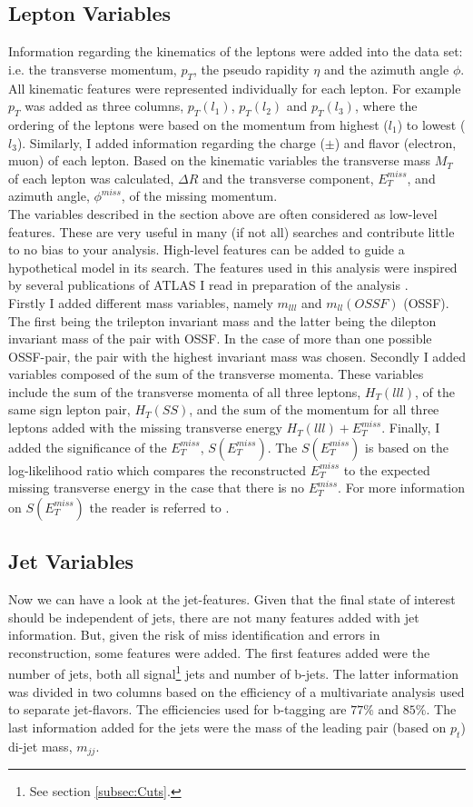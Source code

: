 \subsection{Lepton Variables}\label{subsec:LepSel}
Information regarding the kinematics of the leptons were added into the data set: i.e. the transverse momentum, $p_T$, the pseudo 
rapidity $\eta$ and the azimuth angle $\phi$. All kinematic features were represented individually for each lepton. For example $p_T$
was added as three columns, $p_T(l_1)$, $p_T(l_2)$ and $p_T(l_3)$, where the ordering of the leptons were based on the momentum from highest ($l_1$) to lowest ($l_3$).
Similarly, I added information regarding the charge ($\pm$) and flavor (electron, muon) of each lepton. Based on the kinematic variables
the transverse mass $M_T$ of each lepton was calculated, $\Delta R$ and the transverse component, $E_T^{miss}$, and azimuth angle, $\phi^{miss}$,
of the missing momentum.
\\
The variables described in the section above are often considered as low-level features. These are very useful in many (if not all)
searches and contribute little to no bias to your analysis. High-level features can be added to guide a hypothetical model 
in its search. The features used in this analysis were inspired by several publications of \ac{ATLAS} I read in 
preparation of the analysis \cite{franchini_search_2019, atlas_search_2021}. 
\\
Firstly I added different mass variables, namely $m_{lll}$ and $m_{ll}(OSSF)$ (\ac{OSSF}). The first being the trilepton invariant mass 
and the latter being the dilepton invariant mass of the pair with \ac{OSSF}. In the case of more than one possible \ac{OSSF}-pair,
the pair with the highest invariant mass was chosen. Secondly I added variables composed of the sum of the transverse momenta.
These variables include the sum of the transverse momenta of all three leptons, $H_T(lll)$, of the same sign lepton pair, $H_T(SS)$, and the sum of the momentum
for all three leptons added with the missing transverse energy $H_T(lll) + E_T^{miss}$. Finally, I added the significance of the
$E_T^{miss}$, $S(E_T^{miss})$. The $S(E_T^{miss})$ is based on the log-likelihood ratio which compares the reconstructed $E_T^{miss}$ to 
the expected missing transverse energy in the case that there is no $E_T^{miss}$. For more information on $S(E_T^{miss})$ the reader is 
referred to \cite{object_based_2018}.
\subsection{Jet Variables}\label{subsec:JetSel}
Now we can have a look at the jet-features. Given that the final state of interest should be independent of jets, there are not many
features added with jet information. But, given the risk of miss identification and errors in reconstruction, some features were 
added. The first features added were the number of jets, both all signal\footnote{See section \ref{subsec:Cuts}.} jets and number of b-jets.
The latter information was divided in two columns based on the efficiency of a multivariate analysis used to separate jet-flavors.
The efficiencies used for b-tagging are $77\%$ and $85\%$. The last information added for the jets were the mass of the leading pair 
(based on $p_t$) di-jet mass, $m_{jj}$.

